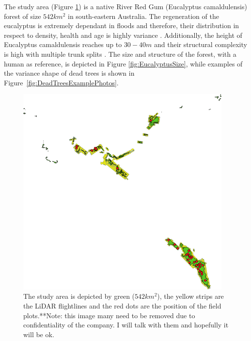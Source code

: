 \documentclass{subfiles}
\begin{document}
The study area (Figure \ref{fig:StudyArea}) is a native River Red Gum (Eucalyptus camaldulensis) forest  of size $542km^2$ in south-eastern Australia. The regeneration of the eucalyptus is extremely dependant in floods and therefore, their distribution in respect to density, health and age is highly variance \cite{Kerle2005}. Additionally, the height of Eucalyptus camaldulensis reaches up to $30-40m$ and their structural complexity is high with multiple trunk splits \cite{Wilson1995}. The size and structure of the forest, with a human as reference, is depicted in Figure \ref{fig:EucalyptusSize}, while examples of the variance shape of dead trees is shown in Figure~\ref{fig:DeadTreesExamplePhotos}. 

\begin{figure} [h!]
	\centering
	\begin{framed}
		\includegraphics[width=0.965\textwidth]{img/dead/StudyArea}
	\end{framed}
	\caption{The study area is depicted by green ($542km^2$), the yellow strips are the LiDAR flightlines and the red dots are the position of the field plots.{\color{red}**Note: this image many need to be removed due to confidentiality of the company. I will talk with them and hopefully it will be ok.}}
	\label{fig:StudyArea}
\end{figure}
\end{document}
